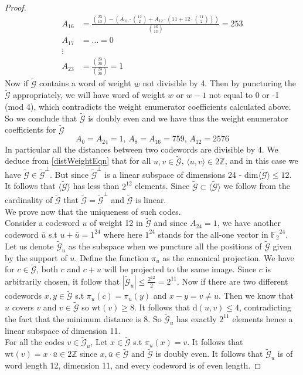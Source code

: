 \documentclass{article}
\numberwithin{equation}{theorem}
\numberwithin{figure}{theorem}
\newcommand{\cCodes}{\ensuremath{\widetilde{\mathscr{G}}}}
\newcommand{\cCodesVertical}{\cCodes^{\bot}}
\newcommand{\ftwoN}[1]{\ensuremath{\mathbb{F}_2}^{#1}}
\newcommand{\wt}[1]{\ensuremath{\text{wt}(#1)}}
\newcommand{\dist}[2]{\ensuremath{\text{d}(#1,#2)}}
\newcommand{\Integer}{\ensuremath{\mathbb{Z}}}
\begin{document}
\begin{proof}
\begin{align*}
		A_{16} &= \frac{\binom{23}{13} - (A_{11} \cdot \binom{12}{2} + A_{12}\cdot(11 + 12 \cdot\binom{11}{2}))}{\binom{16}{13}} = 253\\
		A_{17} &= \ldots = 0 \\
		\vdots\\
		A_{23} &= \frac{\binom{23}{20}}{\binom{23}{20}} = 1
	\end{align*}
Now if {\cCodes} contains a word of weight $w$ not divisible by 4. Then by puncturing the {\cCodes} appropriately, we will have word of weight $w$ or $w - 1$ not equal to 0 or -1 (mod 4), which contradicts the weight enumerator coefficients calculated above. So we conclude that {\cCodes} is doubly even and we have thus the weight enumerator coefficients for {\cCodes}
\[
	A_0 = A_{24} = 1, \, A_{8} = A_{16} = 759,\, A_{12} = 2576
\]
In particular all the distances between two codewords are divisible by 4. We deduce from \ref{distWeightEqn} that for all
$u,v \in \cCodes$, $\langle u, v\rangle \in 2\Integer$, and in this case we have $\cCodes \in \cCodesVertical$. But since $\cCodesVertical$ is a linear subspace of dimensions 24 - dim$\langle \cCodes \rangle \leq 12$. It follows that $\langle \cCodes \rangle$ has less than $2^{12}$ elements. Since $\cCodes \subset \langle \cCodes \rangle$ we follow from the cardinality of $\cCodes$ that $\cCodes = \cCodesVertical$ and $\cCodes$ is linear.\\
We prove now that the uniqueness of such codes. \\
Consider a codeword $u$ of weight 12 in {\cCodes} and since $A_{24} = 1$, we have another codeword $\bar{u}$ s.t $u + \bar{u} = 1^{24}$ where here $1^{24}$ stands for the all-one vector in $\ftwoN{24}$. Let us denote $\cCodes_u$ as the subspace when we puncture all the positions of $\cCodes$ given by the support of $u$. Define the function $\pi_{u}$ as the canonical projection.
We have for $c \in \cCodes$, both $c$ and $c + u$ will be projected to the same image. Since $c$ is arbitrarily chosen, it follow that $|\cCodes_u| \leq \frac{2^{12}}{2} = 2^{11}$. Now if there are two different codewords $x,y \in \cCodes$ s.t $\pi_{u}(c) = \pi_{u}(y)$ and $x - y = v \neq u$. Then we know that $u$ covers $v$ and $v \in \cCodes$ so $\wt{v} \geq 8$. It follows that $\dist{u}{v} \leq 4$, contradicting the fact that the minimum distance is 8. So $\cCodes_u$ has exactly $2^{11}$ elements hence a linear subspace of dimension 11.\\
For all the codes $v \in \cCodes_u$, Let $x \in \cCodes$ s.t $\pi_u(x) = v$. It follows that $\wt{v} = x \cdot \bar{u} \in 2\Integer$ since $x, \bar{u} \in \cCodes$ and $\cCodes$ is doubly even. It follows that $\cCodes_u$ is of word length 12, dimension 11, and every codeword is of even length.

\end{proof}
\end{document}
